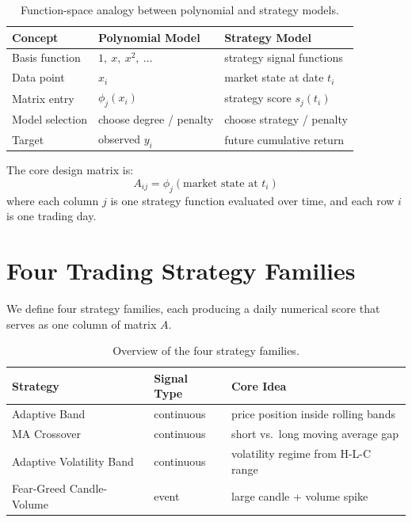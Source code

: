 \documentclass[11pt, letterpaper]{article}
\begin{document}
\begin{table}[h]
\centering
\caption{Function-space analogy between polynomial and strategy models.}
\label{tab:analogy}
\begin{tabular}{lll}
\toprule
Concept        & Polynomial Model                   & Strategy Model \\
\midrule
Basis function & $1,\ x,\ x^2,\ \ldots$             & strategy signal functions \\
Data point     & $x_i$                              & market state at date $t_i$ \\
Matrix entry   & $\phi_j(x_i)$                      & strategy score $s_j(t_i)$ \\
Model selection & choose degree / penalty           & choose strategy / penalty \\
Target         & observed $y_i$                     & future cumulative return \\
\bottomrule
\end{tabular}
\end{table}

The core design matrix is:
\[
  A_{ij} = \phi_j(\text{market state at } t_i)
\]
where each column $j$ is one strategy function evaluated over time, and each row
$i$ is one trading day.

\section{Four Trading Strategy Families}

We define four strategy families, each producing a daily numerical score that
serves as one column of matrix $A$.

\begin{table}[h]
\centering
\caption{Overview of the four strategy families.}
\label{tab:strategies}
\begin{tabular}{lll}
\toprule
Strategy                    & Signal Type & Core Idea \\
\midrule
Adaptive Band               & continuous  & price position inside rolling bands \\
MA Crossover                & continuous  & short vs.\ long moving average gap \\
Adaptive Volatility Band    & continuous  & volatility regime from H-L-C range \\
Fear-Greed Candle-Volume    & event       & large candle + volume spike \\
\bottomrule
\end{tabular}
\end{table}
\end{document}
